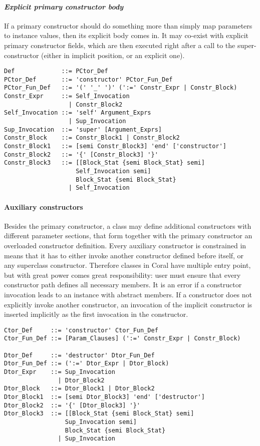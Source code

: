 \paragraph{\em Explicit primary constructor body}
If a primary constructor should do something more than simply map parameters to instance values, then its explicit body comes in. It may co-exist with explicit primary constructor fields, which are then executed right after a call to the super-constructor (either in implicit position, or an explicit one). 
\syntax\begin{lstlisting}
Def             ::= PCtor_Def
PCtor_Def       ::= 'constructor' PCtor_Fun_Def
PCtor_Fun_Def   ::= '(' '_' ')' (':=' Constr_Expr | Constr_Block)
Constr_Expr     ::= Self_Invocation
                  | Constr_Block2
Self_Invocation ::= 'self' Argument_Exprs
                  | Sup_Invocation
Sup_Invocation  ::= 'super' [Argument_Exprs]
Constr_Block    ::= Constr_Block1 | Constr_Block2
Constr_Block1   ::= [semi Constr_Block3] 'end' ['constructor']
Constr_Block2   ::= '{' [Constr_Block3] '}'
Constr_Block3   ::= [[Block_Stat {semi Block_Stat} semi] 
                    Self_Invocation semi] 
                    Block_Stat {semi Block_Stat}
                  | Self_Invocation
\end{lstlisting}

\paragraph{Auxiliary constructors}
Besides the primary constructor, a class may define additional constructors with different parameter sections, that form together with the primary constructor an overloaded constructor definition. Every auxiliary constructor is constrained in means that it has to either invoke another constructor defined before itself, or any superclass constructor. Therefore classes in Coral have multiple entry point, but with great power comes great responsibility: user must ensure that every constructor path defines all necessary members. It is an error if a constructor invocation leads to an instance with abstract members. If a constructor does not explicitly invoke another constructor, an invocation of the implicit constructor is inserted implicitly as the first invocation in the constructor. 

\syntax\begin{lstlisting}
Ctor_Def     ::= 'constructor' Ctor_Fun_Def
Ctor_Fun_Def ::= [Param_Clauses] (':=' Constr_Expr | Constr_Block)

Dtor_Def     ::= 'destructor' Dtor_Fun_Def
Dtor_Fun_Def ::= (':=' Dtor_Expr | Dtor_Block)
Dtor_Expr    ::= Sup_Invocation
               | Dtor_Block2
Dtor_Block   ::= Dtor_Block1 | Dtor_Block2
Dtor_Block1  ::= [semi Dtor_Block3] 'end' ['destructor']
Dtor_Block2  ::= '{' [Dtor_Block3] '}'
Dtor_Block3  ::= [[Block_Stat {semi Block_Stat} semi] 
                 Sup_Invocation semi] 
                 Block_Stat {semi Block_Stat}
               | Sup_Invocation
\end{lstlisting}

